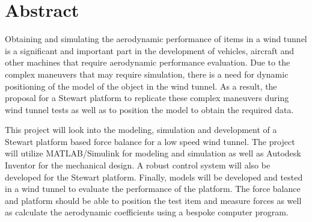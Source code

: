 
\section*{Abstract}
\label{sec:Abstract}
Obtaining and simulating the aerodynamic performance of items in a wind tunnel is a
significant and important part in the development of vehicles, aircraft and other machines
that require aerodynamic performance evaluation. Due to the complex maneuvers that may require simulation, there is a need for dynamic positioning of the model of the object in the wind tunnel. As a result, the proposal for a Stewart platform to replicate these complex maneuvers during wind tunnel tests as well as to position the model to obtain the required data.

This project will look into the modeling, simulation and development of a Stewart
platform based force balance for a low speed wind tunnel. The project will utilize
MATLAB/Simulink for modeling and simulation as well as Autodesk Inventor for the mechanical
design. A robust control system will also be developed for the Stewart platform.
Finally, models will be developed and tested in a wind tunnel to evaluate the performance
of the platform. The force balance and platform should be able to position the test
item and measure forces as well as calculate the aerodynamic coefficients using a bespoke computer program.




